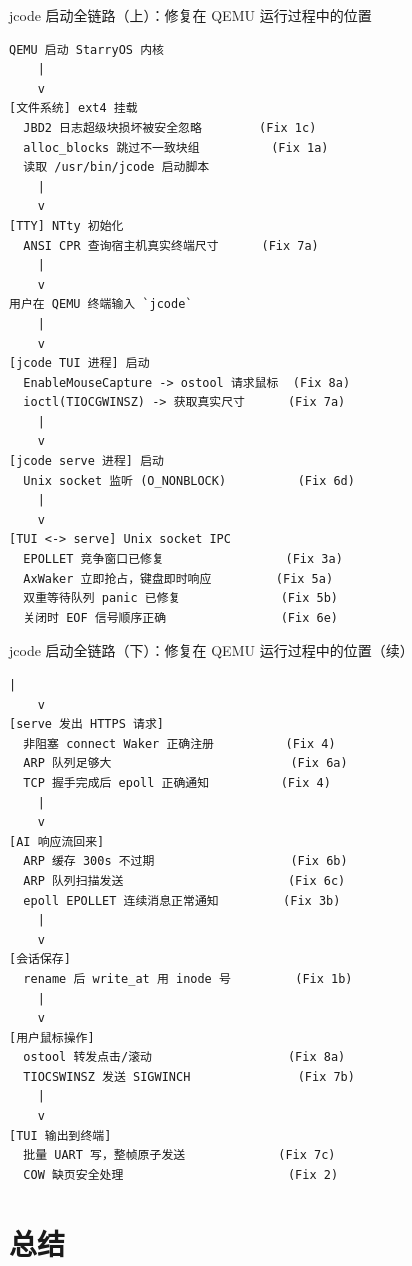 \documentclass{beamer}
\begin{document}
\begin{frame}[fragile]{\footnotesize jcode 启动全链路（上）：修复在 QEMU 运行过程中的位置}
    \begin{lstlisting}[basicstyle=\ttfamily\tiny, frame=none, aboveskip=0pt, belowskip=0pt]
QEMU 启动 StarryOS 内核
    |
    v
[文件系统] ext4 挂载
  JBD2 日志超级块损坏被安全忽略        (Fix 1c)
  alloc_blocks 跳过不一致块组          (Fix 1a)
  读取 /usr/bin/jcode 启动脚本
    |
    v
[TTY] NTty 初始化
  ANSI CPR 查询宿主机真实终端尺寸      (Fix 7a)
    |
    v
用户在 QEMU 终端输入 `jcode`
    |
    v
[jcode TUI 进程] 启动
  EnableMouseCapture -> ostool 请求鼠标  (Fix 8a)
  ioctl(TIOCGWINSZ) -> 获取真实尺寸      (Fix 7a)
    |
    v
[jcode serve 进程] 启动
  Unix socket 监听 (O_NONBLOCK)          (Fix 6d)
    |
    v
[TUI <-> serve] Unix socket IPC
  EPOLLET 竞争窗口已修复                 (Fix 3a)
  AxWaker 立即抢占，键盘即时响应         (Fix 5a)
  双重等待队列 panic 已修复              (Fix 5b)
  关闭时 EOF 信号顺序正确                (Fix 6e)\end{lstlisting}
\end{frame}

\begin{frame}[fragile]{\footnotesize jcode 启动全链路（下）：修复在 QEMU 运行过程中的位置（续）}
    \begin{lstlisting}[basicstyle=\ttfamily\tiny, frame=none, aboveskip=0pt, belowskip=0pt]
    |
    v
[serve 发出 HTTPS 请求]
  非阻塞 connect Waker 正确注册          (Fix 4)
  ARP 队列足够大                         (Fix 6a)
  TCP 握手完成后 epoll 正确通知          (Fix 4)
    |
    v
[AI 响应流回来]
  ARP 缓存 300s 不过期                   (Fix 6b)
  ARP 队列扫描发送                       (Fix 6c)
  epoll EPOLLET 连续消息正常通知         (Fix 3b)
    |
    v
[会话保存]
  rename 后 write_at 用 inode 号         (Fix 1b)
    |
    v
[用户鼠标操作]
  ostool 转发点击/滚动                   (Fix 8a)
  TIOCSWINSZ 发送 SIGWINCH               (Fix 7b)
    |
    v
[TUI 输出到终端]
  批量 UART 写，整帧原子发送             (Fix 7c)
  COW 缺页安全处理                       (Fix 2)\end{lstlisting}
\end{frame}

\section{总结}
\end{document}
